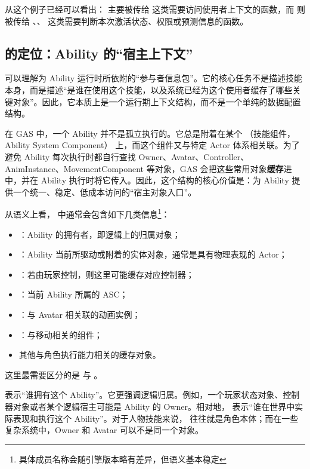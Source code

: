 从这个例子已经可以看出： 主要被传给  这类需要访问使用者上下文的函数，而  则被传给 、、 这类需要判断本次激活状态、权限或预测信息的函数。

\subsection{ 的定位：Ability 的“宿主上下文”}

 可以理解为 Ability 运行时所依附的“参与者信息包”。它的核心任务不是描述技能本身，而是描述“是谁在使用这个技能，以及系统已经为这个使用者缓存了哪些关键对象”。因此，它本质上是一个运行期上下文结构，而不是一个单纯的数据配置结构。

在 GAS 中，一个 Ability 并不是孤立执行的。它总是附着在某个 （技能组件，Ability System Component） 上，而这个组件又与特定 Actor 体系相关联。为了避免 Ability 每次执行时都自行查找 Owner、Avatar、Controller、AnimInstance、MovementComponent 等对象，GAS 会把这些常用对象\textbf{缓存}进  中，并在 Ability 执行时将它传入。因此，这个结构的核心价值是：为 Ability 提供一个统一、稳定、低成本访问的“宿主对象入口”。

从语义上看， 中通常会包含如下几类信息\footnote{具体成员名称会随引擎版本略有差异，但语义基本稳定}：
\begin{itemize}
	\item {}：Ability 的拥有者，即逻辑上的归属对象；
	\item {}：Ability 当前所驱动或附着的实体对象，通常是具有物理表现的 Actor；
	\item {}：若由玩家控制，则这里可能缓存对应控制器；
	\item {}：当前 Ability 所属的 ASC；
	\item {}：与 Avatar 相关联的动画实例；
	\item {}：与移动相关的组件；
	\item 其他与角色执行能力相关的缓存对象。
\end{itemize}

这里最需要区分的是  与 。

 表示“谁拥有这个 Ability”。它更强调逻辑归属。例如，一个玩家状态对象、控制器对象或者某个逻辑宿主可能是 Ability 的 Owner。相对地， 表示“谁在世界中实际表现和执行这个 Ability”。对于人物技能来说， 往往就是角色本体；而在一些复杂系统中，Owner 和 Avatar 可以不是同一个对象。

